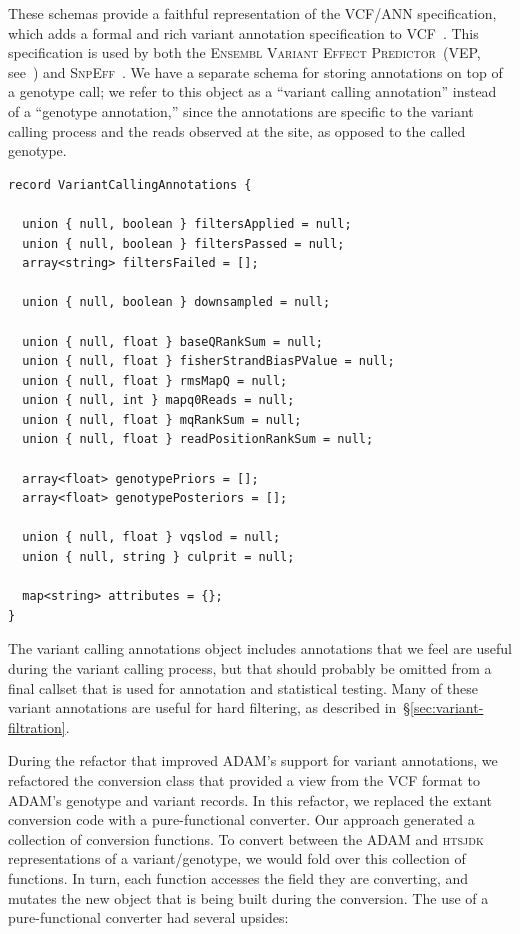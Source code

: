 \documentclass[phd]{ucbthesis}
\begin{document}
These schemas provide a faithful representation of the VCF/ANN specification,
which adds a formal and rich variant annotation specification to
VCF~\cite{ann}. This specification is used by both the \textsc{Ensembl Variant
  Effect Predictor}~(VEP, see~\cite{mclaren10}) and \textsc{SnpEff}~\cite{cingolani12}.
We have a separate schema for storing annotations on top of a genotype call; we
refer to this object as a ``variant calling annotation'' instead of a ``genotype
annotation,'' since the annotations are specific to the variant calling process
and the reads observed at the site, as opposed to the called genotype.

\begin{lstlisting}[caption=\textsc{ADAM} genotype annotation schema]
record VariantCallingAnnotations {

  union { null, boolean } filtersApplied = null;
  union { null, boolean } filtersPassed = null;
  array<string> filtersFailed = [];

  union { null, boolean } downsampled = null;

  union { null, float } baseQRankSum = null;
  union { null, float } fisherStrandBiasPValue = null;
  union { null, float } rmsMapQ = null;
  union { null, int } mapq0Reads = null;
  union { null, float } mqRankSum = null;
  union { null, float } readPositionRankSum = null;

  array<float> genotypePriors = [];
  array<float> genotypePosteriors = [];

  union { null, float } vqslod = null;
  union { null, string } culprit = null;

  map<string> attributes = {};
}
\end{lstlisting}

The variant calling annotations object includes annotations that we feel are
useful during the variant calling process, but that should probably be omitted
from a final callset that is used for annotation and statistical testing. Many
of these variant annotations are useful for hard filtering, as described
in~\S\ref{sec:variant-filtration}.

During the refactor that improved \textsc{ADAM}'s support for variant
annotations, we refactored the conversion class that provided a view from the
VCF format to \textsc{ADAM}'s genotype and variant records. In this refactor,
we replaced the extant conversion code with a pure-functional converter. Our
approach generated a collection of conversion functions. To convert between
the \textsc{ADAM} and \textsc{htsjdk} representations of a variant/genotype,
we would fold over this collection of functions. In turn, each function accesses
the field they are converting, and mutates the new object that is being built
during the conversion. The use of a pure-functional converter had several
upsides:
\end{document}
